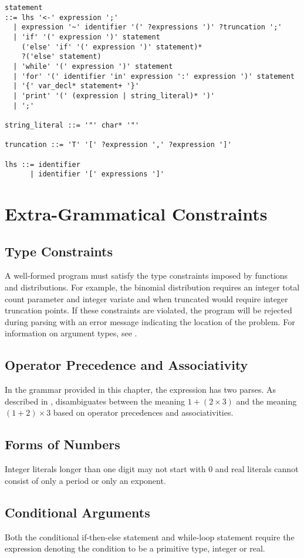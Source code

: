 {
\small
\begin{Verbatim}[fontsize=\small]
statement 
::= lhs '<-' expression ';'
  | expression '~' identifier '(' ?expressions ')' ?truncation ';'
  | 'if' '(' expression ')' statement
    ('else' 'if' '(' expression ')' statement)*
    ?('else' statement)
  | 'while' '(' expression ')' statement
  | 'for' '(' identifier 'in' expression ':' expression ')' statement
  | '{' var_decl* statement+ '}'
  | 'print' '(' (expression | string_literal)* ')'
  | ';'

string_literal ::= '"' char* '"'

truncation ::= 'T' '[' ?expression ',' ?expression ']'

lhs ::= identifier
      | identifier '[' expressions ']'

\end{Verbatim}
%
}

\section{Extra-Grammatical Constraints}

\subsection{Type Constraints}

A well-formed \Stan program
must satisfy the type constraints imposed by functions and
distributions.  For example, the binomial distribution requires an
integer total count parameter and integer variate and when truncated
would require integer truncation points.  If these constraints are
violated, the program will be rejected during parsing with an error
message indicating the location of the problem.  For information on
argument types, see .

\subsection{Operator Precedence and Associativity}

In the \Stan grammar provided in this chapter, the expression  has two parses.  As described in
, \Stan disambiguates between the
meaning $1 + (2 \times 3)$ and the meaning $(1 + 2) \times 3$ based on
operator precedences and associativities. 

\subsection{Forms of Numbers}

Integer literals longer than one digit may not start with 0 and real
literals cannot consist of only a period or only an exponent.

\subsection{Conditional Arguments}

Both the conditional if-then-else statement and while-loop statement
require the expression denoting the condition to be a primitive type,
integer or real.
